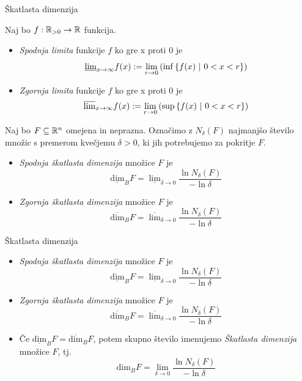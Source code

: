 \documentclass[10pt]{beamer}
\begin{document}
\begin{frame}[t]{Škatlasta dimenzija}
     {
        \begin{definicija}
            Naj bo \(f: \mathbb{R}_{>0} \to \mathbb{R}\) funkcija. 
            \begin{itemize}
                \item \emph{Spodnja limita} funkcije \(f\) ko gre x proti \(0\) je 
                \[\underline{\lim}_{x \to \infty} f(x) := \lim_{r \to 0} \left(\inf \left\{f(x) \ | \ 0< x < r\right\}\right)\]
                \item \emph{Zgornja limita} funkcije \(f\) ko gre x proti \(0\) je 
                \[\overline{\lim}_{x \to \infty} f(x) := \lim_{r \to 0} \left(\sup \left\{f(x) \ | \ 0< x < r\right\}\right)\]
            \end{itemize}
        \end{definicija}
    }

    \pause
    Naj bo \(F \subseteq \mathbb{R}^n\) omejena in neprazna. Označimo z \(N_\delta(F)\) najmanjšo število množic s premerom kvečjemu \(\delta>0\), ki jih potrebujemo za pokritje \(F\).
    
    \pause   
    \begin{definicija}
        \begin{itemize}
            \item \emph{Spodnja škatlasta dimenzija} množice \(F\) je 
            \[\underline{\text{dim}}_B F = \underline{\lim}_{\delta \to 0} \frac{\ln N_\delta(F)}{-\ln \delta}\]
            \item \emph{Zgornja škatlasta dimenzija} množice \(F\) je 
            \[\overline{\text{dim}}_B F = \overline{\lim}_{\delta \to 0} \frac{\ln N_\delta(F)}{-\ln \delta}\]
        \end{itemize}  
    \end{definicija}
\end{frame}

\begin{frame}[t]{Škatlasta dimenzija}  
    \begin{definicija}
        \begin{itemize}
            \item \emph{Spodnja škatlasta dimenzija} množice \(F\) je 
            \[\underline{\text{dim}}_B F = \underline{\lim}_{\delta \to 0} \frac{\ln N_\delta(F)}{-\ln \delta}\]
            \item \emph{Zgornja škatlasta dimenzija} množice \(F\) je 
            \[\overline{\text{dim}}_B F = \overline{\lim}_{\delta \to 0} \frac{\ln N_\delta(F)}{-\ln \delta}\]
            \item Če \(\underline{\text{dim}}_B F = \overline{\text{dim}}_B F\), potem skupno število imenujemo \emph{Škatlasta dimenzija} množice \(F\), tj. 
            \[\text{dim}_B F = \lim_{\delta \to 0} \frac{\ln N_\delta(F)}{-\ln \delta}\]
        \end{itemize}  
    \end{definicija}
\end{frame}
\end{document}
